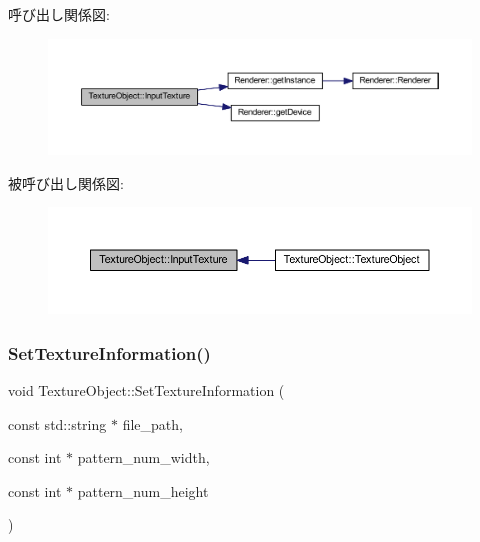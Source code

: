 呼び出し関係図\+:
\nopagebreak
\begin{figure}[H]
\begin{center}
\leavevmode
\includegraphics[width=350pt]{class_texture_object_a93196fc80c026672b8a15cec21ef5dea_cgraph}
\end{center}
\end{figure}
被呼び出し関係図\+:\nopagebreak
\begin{figure}[H]
\begin{center}
\leavevmode
\includegraphics[width=350pt]{class_texture_object_a93196fc80c026672b8a15cec21ef5dea_icgraph}
\end{center}
\end{figure}
\mbox{\label{class_texture_object_a76d33ff56004c8f8f00b004849990940}} 
\subsubsection{\texorpdfstring{Set\+Texture\+Information()}{SetTextureInformation()}}
{\footnotesize\ttfamily void Texture\+Object\+::\+Set\+Texture\+Information (\begin{DoxyParamCaption}\item[{const std\+::string $\ast$}]{file\+\_\+path,  }\item[{const int $\ast$}]{pattern\+\_\+num\+\_\+width,  }\item[{const int $\ast$}]{pattern\+\_\+num\+\_\+height }\end{DoxyParamCaption})\hspace{0.3cm}{\ttfamily [private]}}



